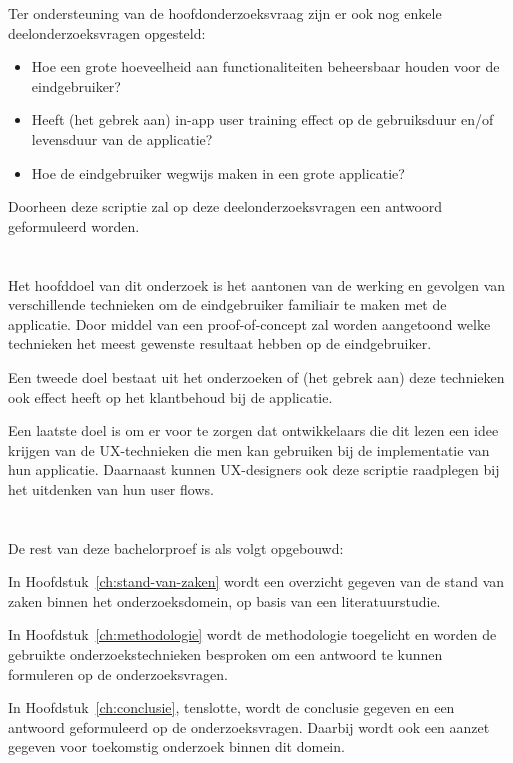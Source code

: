 Ter ondersteuning van de hoofdonderzoeksvraag zijn er ook nog enkele deelonderzoeksvragen opgesteld:

\begin{itemize}
    \item Hoe een grote hoeveelheid aan functionaliteiten beheersbaar houden voor de eindgebruiker?
    \item Heeft (het gebrek aan) in-app user training effect op de gebruiksduur en/of levensduur van de applicatie?
    \item Hoe de eindgebruiker wegwijs maken in een grote applicatie?
\end{itemize}

Doorheen deze scriptie zal op deze deelonderzoeksvragen een antwoord geformuleerd worden.

\section{}
\label{sec:onderzoeksdoelstelling}

Het hoofddoel van dit onderzoek is het aantonen van de werking en gevolgen van verschillende technieken om de eindgebruiker familiair te maken met de applicatie. Door middel van een proof-of-concept zal worden aangetoond welke technieken het meest gewenste resultaat hebben op de eindgebruiker.

Een tweede doel bestaat uit het onderzoeken of (het gebrek aan) deze technieken ook effect heeft op het klantbehoud bij de applicatie.

Een laatste doel is om er voor te zorgen dat ontwikkelaars die dit lezen een idee krijgen van de UX-technieken die men kan gebruiken bij de implementatie van hun applicatie. Daarnaast kunnen UX-designers ook deze scriptie raadplegen bij het uitdenken van hun user flows.

\section{}
\label{sec:opzet-bachelorproef}


De rest van deze bachelorproef is als volgt opgebouwd:

In Hoofdstuk~\ref{ch:stand-van-zaken} wordt een overzicht gegeven van de stand van zaken binnen het onderzoeksdomein, op basis van een literatuurstudie.

In Hoofdstuk~\ref{ch:methodologie} wordt de methodologie toegelicht en worden de gebruikte onderzoekstechnieken besproken om een antwoord te kunnen formuleren op de onderzoeksvragen.


In Hoofdstuk~\ref{ch:conclusie}, tenslotte, wordt de conclusie gegeven en een antwoord geformuleerd op de onderzoeksvragen. Daarbij wordt ook een aanzet gegeven voor toekomstig onderzoek binnen dit domein.